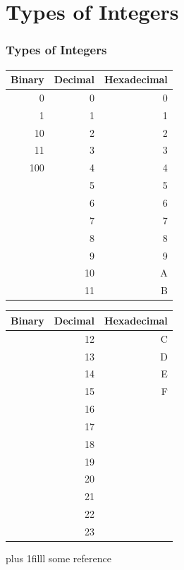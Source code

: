 \documentclass[fleqn]{beamer} %
\newcommand{\sectiontitleII}{Types of Integers}
\newcommand{\btVFill}{\vskip0pt plus 1filll}
\begin{document}
	
\section{\sectiontitleII}	

\begin{frame}[label=sectionII] \small
\frametitle{\sectiontitleII}
\bigskip

\begin{multicols}{2}
\begin{tabular}{|r|r|r|} \hline
	Binary 	& Decimal 	& Hexadecimal \\ \hline
	0		& 0			& 0 		\\ \hline	
	1		& 1			& 1 		\\ \hline
	10		& 2			& 2 		\\ \hline
	11		& 3			& 3 		\\ \hline
	100		& 4			& 4 		\\ \hline
			& 5			& 5 		\\ \hline
			& 6			& 6 		\\ \hline
		    & 7			& 7 		\\ \hline
			& 8			& 8 		\\ \hline
			& 9			& 9 		\\ \hline
			& 10		& A 		\\ \hline
			& 11		& B 		\\ \hline
\end{tabular}

\begin{tabular}{|r|r|r|} \hline
	Binary 	& Decimal 	& Hexadecimal \\ \hline
			& 12		& C 		\\ \hline	
			& 13		& D 		\\ \hline
			& 14		& E 		\\ \hline
			& 15		& F 		\\ \hline
			& 16		&  		\\ \hline
			& 17		&  		\\ \hline
			& 18		&  		\\ \hline
			& 19		&  		\\ \hline
			& 20		&  		\\ \hline
			& 21		&  		\\ \hline
			& 22	    &  		\\ \hline
			& 23	    &  		\\ \hline
\end{tabular}
\end{multicols}

\btVFill
\tiny{some reference}		

\end{frame}
\end{document}
